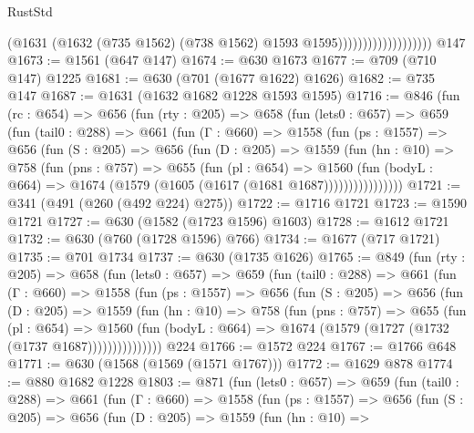 \begin{lexlean}{RustStd}
\begin{coremodule}
{\begin{coremodule}
{{{{{{{{{{                                      (@1631
                                        (@1632
                                          (@735 @1562)
                                          (@738 @1562)
                                          @1593
                                          @1595)))))))))))))))))))
    @147
@1673 := @1561 (@647 @147)
@1674 := @630 @1673
@1677 := @709 (@710 @147) @1225
@1681 := @630 (@701 (@1677 @1622) @1626)
@1682 := @735 @147
@1687 := @1631 (@1632 @1682 @1228 @1593 @1595)
@1716 := @846
    (fun (rc : @654) =>
    @656
      (fun (rty : @205) =>
      @658
        (fun (lets0 : @657) =>
        @659
          (fun (tail0 : @288) =>
          @661
            (fun (Γ : @660) =>
            @1558
              (fun (ps : @1557) =>
              @656
                (fun (S : @205) =>
                @656
                  (fun (D : @205) =>
                  @1559
                    (fun (hn : @10) =>
                    @758
                      (fun (pns : @757) =>
                      @655
                        (fun (pl : @654) =>
                        @1560
                          (fun (bodyL : @664) =>
                          @1674 (@1579 (@1605 (@1617 (@1681 @1687))))))))))))))))
@1721 := @341 (@491 (@260 (@492 @224) @275))
@1722 := @1716 @1721
@1723 := @1590 @1721
@1727 := @630 (@1582 (@1723 @1596) @1603)
@1728 := @1612 @1721
@1732 := @630 (@760 (@1728 @1596) @766)
@1734 := @1677 (@717 @1721)
@1735 := @701 @1734
@1737 := @630 (@1735 @1626)
@1765 := @849
    (fun (rty : @205) =>
    @658
      (fun (lets0 : @657) =>
      @659
        (fun (tail0 : @288) =>
        @661
          (fun (Γ : @660) =>
          @1558
            (fun (ps : @1557) =>
            @656
              (fun (S : @205) =>
              @656
                (fun (D : @205) =>
                @1559
                  (fun (hn : @10) =>
                  @758
                    (fun (pns : @757) =>
                    @655
                      (fun (pl : @654) =>
                      @1560
                        (fun (bodyL : @664) =>
                        @1674 (@1579 (@1727 (@1732 (@1737 @1687)))))))))))))))
    @224
@1766 := @1572 @224
@1767 := @1766 @648
@1771 := @630 (@1568 (@1569 (@1571 @1767)))
@1772 := @1629 @878
@1774 := @880 @1682 @1228
@1803 := @871
    (fun (lets0 : @657) =>
    @659
      (fun (tail0 : @288) =>
      @661
        (fun (Γ : @660) =>
        @1558
          (fun (ps : @1557) =>
          @656
            (fun (S : @205) =>
            @656
              (fun (D : @205) =>
              @1559
                (fun (hn : @10) =>
}}}}}}}}}}
\end{coremodule}}
\end{coremodule}
\end{lexlean}
